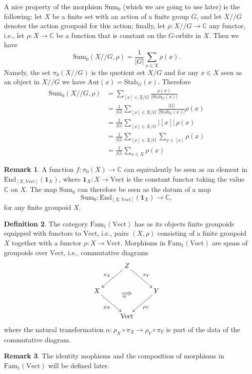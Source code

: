 \documentclass[12pt]{scrartcl}
\theoremstyle{definition}
\newtheorem{definition}{Definition}
\newtheorem{remark}[definition]{Remark}
\numberwithin{equation}{section}
\numberwithin{definition}{section}
\numberwithin{figure}{section}
\begin{document}
A nice property of the morphism $\mathrm{Sum}_0$ (which we are going to use later) is the following: let $X$ be a finite set with an action of a finite group $G$, and let $X/\!/G$ denotes the action groupoid for this action; finally, let $\rho\colon X/\!/G\to \mathbb{C}$ any functor, i.e., let $\rho\colon X\to \mathbb{C}$ be a function that is constant on the $G$-orbits in $X$. Then we have
\begin{equation}\label{sum-0-on-action-groupoids}
\mathrm{Sum}_0(X/\!/G,\rho)=\frac{1}{|G|}\sum_{x\in X} \rho(x).
\end{equation}
Namely, the set $\pi_0(X/\!/G)$ is the quotient set $X/G$ and for any $x\in X$ seen as an object in $X/\!/G$ we have $\mathrm{Aut}(x)=\mathrm{Stab}_G(x)$. Therefore
\begin{align*}
\mathrm{Sum}_0(X/\!/G,\rho)&=\sum_{[x]\in X/G}\frac{\rho(x)}{|\mathrm{Stab}_G(x)|}\\
&=\frac{1}{|G|}\sum_{[x]\in X/G}\frac{|G|}{|\mathrm{Stab}_G(x)|}\rho(x)\\
&=\frac{1}{|G|}\sum_{[x]\in X/G}|[x]|\,\rho(x)\\
&=\frac{1}{|G|}\sum_{[x]\in X/G}\sum_{x\in [x]}\rho(x)\\
&=\frac{1}{|G|}\sum_{x\in X}\rho(x)
\end{align*}
\begin{remark}
A function $f\colon \pi_0(X)\to \mathbb{C}$ can equivalently be seen as an element in $\mathrm{End}_{[X,\mathrm{Vect}]}(\mathbf{1}_X)$, where $\mathbf{1}_X\colon X\to \mathrm{Vect}$ is the constant functor taking the value $\mathbb{C}$ on $X$. The map $\mathrm{Sum}_0$ can therefore be seen as the datum of a map
\[
\mathrm{Sum}_0\colon \mathrm{End}_{[X,\mathrm{Vect}]}(\mathbf{1}_X) \to \mathbb{C},
\]
for any finite groupoid $X$.
\end{remark}

\begin{definition}
The category $\mathrm{Fam}_1(\mathrm{Vect})$ has as its objects finite groupoids equipped with functors to $\mathrm{Vect}$, i.e., pairs $(X,\rho)$ consisting of a finite groupoid $X$ together with a functor $\rho\colon X\to \mathrm{Vect}$. Morphisms in $\mathrm{Fam}_1(\mathrm{Vect})$ are spans of groupoids over $\mathrm{Vect}$, i.e., commutative diagrams
\[
\xymatrix{
&Z\ar[dl]_{\pi_X}\ar[dr]^{\pi_Y}&\\
X\ar[dr]_{\rho_X}&&Y\ar[dl]^{\rho_Y}\\
&\mathrm{Vect}
\ar@{=>}_{\alpha\phantom{m}}(13,-14);(18,-14)
}
\]
where the natural transformation $\alpha\colon \rho_X\circ \pi_X\to \rho_Y\circ \pi_Y$ is part of the data of the commutative diagram.
\end{definition}
\begin{remark}
The identity mophisms and the composition of morphisms in $\mathrm{Fam}_1(\mathrm{Vect})$ will be defined later.
\end{remark}
\end{document}
